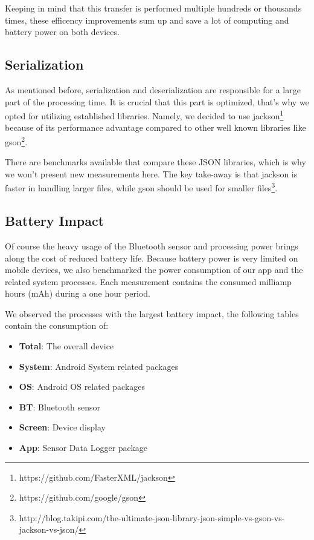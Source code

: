 Keeping in mind that this transfer is performed multiple hundreds or thousands times, these efficency improvements sum up and save a lot of computing and battery power on both devices.

\subsection{Serialization}
As mentioned before, serialization and deserialization are responsible for a large part of the processing time.
It is crucial that this part is optimized, that's why we opted for utilizing established libraries.
Namely, we decided to use jackson\footnote{https://github.com/FasterXML/jackson} because of its performance advantage compared to other well known libraries like gson\footnote{https://github.com/google/gson}.

There are benchmarks available that compare these JSON libraries, which is why we won't present new measurements here.
The key take-away is that jackson is faster in handling larger files, while gson should be used for smaller files\footnote{http://blog.takipi.com/the-ultimate-json-library-json-simple-vs-gson-vs-jackson-vs-json/}.

\subsection{Battery Impact}
Of course the heavy usage of the Bluetooth sensor and processing power brings along the cost of reduced battery life.
Because battery power is very limited on mobile devices, we also benchmarked the power consumption of our app and the related system processes.
Each measurement contains the consumed milliamp hours (mAh) during a one hour period.

We observed the processes with the largest battery impact, the following tables contain the consumption of:

\begin{itemize}[noitemsep]
    \item \textbf{Total}: The overall device
    \item \textbf{System}: Android System related packages
    \item \textbf{OS}: Android OS related packages
    \item \textbf{BT}: Bluetooth sensor
    \item \textbf{Screen}: Device display
    \item \textbf{App}: Sensor Data Logger package
\end{itemize}

